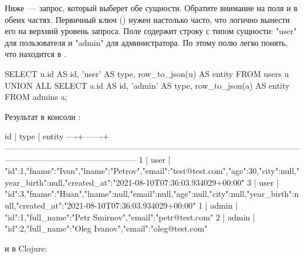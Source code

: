 Ниже~--- запрос, который выберет обе сущности. Обратите внимание на поля  и  в обеих частях. Первичный ключ () нужен настолько часто, что логично вынести его на верхний уровень запроса. Поле  содержит строку с типом сущности: "user" для пользователя и "admin" для администратора. По этому полю легко понять, что находится в .

\begin{english}
  \begin{sql}
SELECT
  u.id AS id,
  'user' AS type,
  row_to_json(u) AS entity
FROM
  users u
UNION ALL
SELECT
  a.id AS id,
  'admin' AS type,
  row_to_json(a) AS entity
FROM
  admins a;
  \end{sql}
\end{english}

Результат в консоли :

\begin{english}
  \begin{text}
 id | type  |                                                                           entity
----+-------+------------------------------------------------------------------------------------------------------------------------------------------------------------
  1 | user  | {"id":1,"fname":"Ivan","lname":"Petrov","email":"test@test.com","age":30,"city":null,"year_birth":null,"created_at":"2021-08-10T07:36:03.934029+00:00"}
  3 | user  | {"id":3,"fname":"Huan","lname":null,"email":null,"age":null,"city":null,"year_birth":null,"created_at":"2021-08-10T07:36:03.934029+00:00"}
  1 | admin | {"id":1,"full_name":"Petr Smirnov","email":"petr@test.com"}
  2 | admin | {"id":2,"full_name":"Oleg Ivanov","email":"oleg@test.com"}
  \end{text}
\end{english}

и в Clojure:

\begin{english}
  \begin{clojure}
  \end{clojure}
\end{english}

